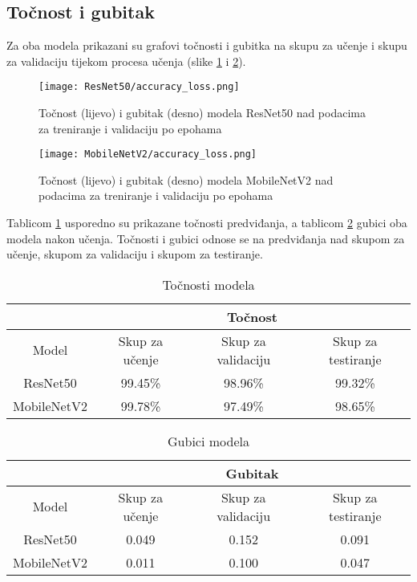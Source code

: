 \documentclass[conference, utf8]{IEEEtran}
\begin{document}
\subsection{Točnost i gubitak}
Za oba modela prikazani su grafovi točnosti i gubitka na skupu za učenje i skupu za validaciju tijekom procesa učenja (slike \ref{fig:RN50_acc_loss} i \ref{fig:MN_acc_loss}). 
\begin{figure}[ht]
	\centering
	\texttt{[image: ResNet50/accuracy\_loss.png]}
	\caption{Točnost (lijevo) i gubitak (desno) modela ResNet50 nad podacima za treniranje i validaciju po epohama}
	\label{fig:RN50_acc_loss}
\end{figure}
\begin{figure}[ht]
	\centering
	\texttt{[image: MobileNetV2/accuracy\_loss.png]}
	\caption{Točnost (lijevo) i gubitak (desno) modela MobileNetV2 nad podacima za treniranje i validaciju po epohama}
	\label{fig:MN_acc_loss}
\end{figure}

Tablicom \ref{table:1} usporedno su prikazane točnosti predviđanja, a tablicom \ref{table:2} gubici oba modela  nakon učenja. Točnosti i gubici odnose se na predviđanja nad skupom za učenje, skupom za validaciju i skupom za testiranje. 


\begin{table}[ht]
	\centering
		\caption{Točnosti modela}
	\label{table:1}
\begin{tabular}{ |c|c|c|c| } 
	\hline
	& \multicolumn{3}{c|}{Točnost} \\
	\hline
	Model & Skup za učenje & Skup za validaciju & Skup za testiranje \\
	\hline \hline
	ResNet50 & 99.45\% & 98.96\% & 99.32\%  \\
	\hline
	MobileNetV2 & 99.78\% & 97.49\% & 98.65\%  \\
	\hline
	\end{tabular}
\end{table}
\begin{table}[ht]
	\centering
	\caption{Gubici modela}
	\label{table:2}
	\begin{tabular}{ |c|c|c|c| } 
		\hline
		& \multicolumn{3}{c|}{Gubitak} \\
		\hline
		Model & Skup za učenje & Skup za validaciju & Skup za testiranje \\
		\hline \hline
		ResNet50 & 0.049 & 0.152 & 0.091  \\
		\hline
		MobileNetV2 & 0.011 & 0.100 & 0.047 \\
		\hline
	\end{tabular}
\end{table}
\end{document}
